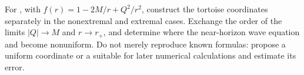 \begin{researchproblem}
For , with $f(r)=1-2M/r+Q^2/r^2$, construct the tortoise coordinates separately in the nonextremal and extremal cases. Exchange the order of the limits $|Q|\to M$ and $r\to r_+$, and determine where the near-horizon wave equation and  become nonuniform. Do not merely reproduce known formulas: propose a uniform coordinate or a  suitable for later numerical calculations and estimate its error.
\end{researchproblem}
